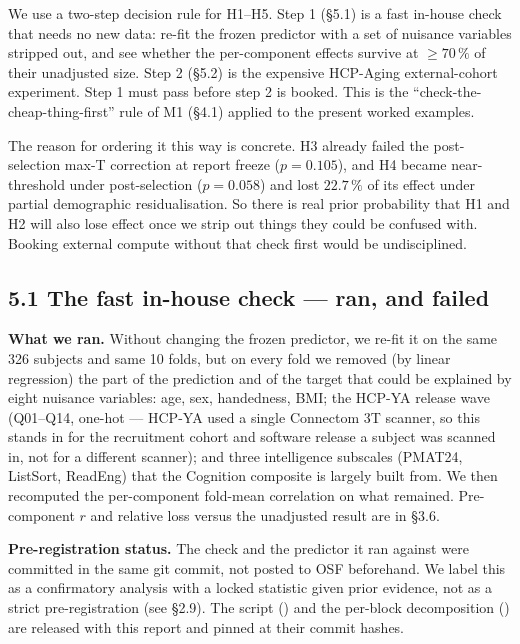 \documentclass[11pt,letterpaper]{report}
\begin{document}



We use a two-step decision rule for H1--H5. Step 1 (\S5.1) is a fast in-house check that needs no new data: re-fit the frozen predictor with a set of nuisance variables stripped out, and see whether the per-component effects survive at $\ge 70\,\%$ of their unadjusted size. Step 2 (\S5.2) is the expensive HCP-Aging external-cohort experiment. Step 1 must pass before step 2 is booked. This is the ``check-the-cheap-thing-first'' rule of M1 (\S4.1) applied to the present worked examples.

The reason for ordering it this way is concrete. H3 already failed the post-selection max-T correction at report freeze ($p = 0.105$), and H4 became near-threshold under post-selection ($p = 0.058$) and lost $22.7\,\%$ of its effect under partial demographic residualisation. So there is real prior probability that H1 and H2 will also lose effect once we strip out things they could be confused with. Booking external compute without that check first would be undisciplined.

\subsection*{5.1 The fast in-house check --- ran, and failed}

\textbf{What we ran.} Without changing the frozen predictor, we re-fit it on the same 326 subjects and same 10 folds, but on every fold we removed (by linear regression) the part of the prediction and of the target that could be explained by eight nuisance variables: age, sex, handedness, BMI; the HCP-YA release wave (Q01--Q14, one-hot --- HCP-YA used a single Connectom 3T scanner, so this stands in for the recruitment cohort and software release a subject was scanned in, not for a different scanner); and three intelligence subscales (PMAT24, ListSort, ReadEng) that the Cognition composite is largely built from. We then recomputed the per-component fold-mean correlation on what remained. Pre-component $r$ and relative loss versus the unadjusted result are in \S3.6.

\textbf{Pre-registration status.} The check and the predictor it ran against were committed in the same git commit, not posted to OSF beforehand. We label this as a confirmatory analysis with a locked statistic given prior evidence, not as a strict pre-registration (see \S2.9). The script () and the per-block decomposition () are released with this report and pinned at their commit hashes.
\end{document}
